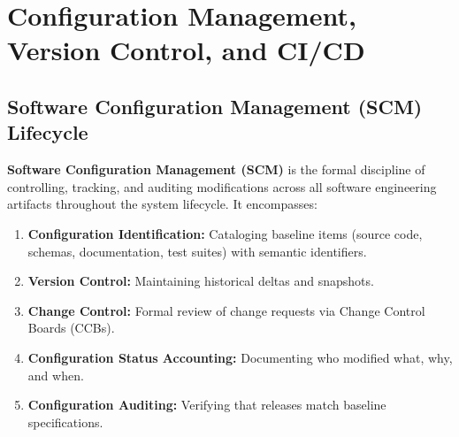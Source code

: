 \section{Configuration Management, Version Control, and CI/CD}
\label{sec:se_scm_git_cicd}

\subsection{Software Configuration Management (SCM) Lifecycle}
\textbf{Software Configuration Management (SCM)} is the formal discipline of controlling, tracking, and auditing modifications across all software engineering artifacts throughout the system lifecycle. It encompasses:
\begin{enumerate}
    \item \textbf{Configuration Identification:} Cataloging baseline items (source code, schemas, documentation, test suites) with semantic identifiers.
    \item \textbf{Version Control:} Maintaining historical deltas and snapshots.
    \item \textbf{Change Control:} Formal review of change requests via Change Control Boards (CCBs).
    \item \textbf{Configuration Status Accounting:} Documenting who modified what, why, and when.
    \item \textbf{Configuration Auditing:} Verifying that releases match baseline specifications.
\end{enumerate}

